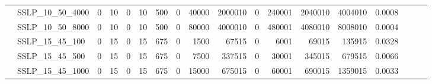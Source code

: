 \begin{landscape}
\begin{longtable}[c]{llrrrrrrrrrrrrrlll}
		& SSLP\_10\_50\_4000           & 0                           & 10                         & 0                          & 10                          & 500                        & 0                          & 40000                      & 2000010                   & 0                         & 240001                     & 2040010                    & 4004010                        & 0.0008                        &                          &                          &                          \\
		& SSLP\_10\_50\_8000           & 0                           & 10                         & 0                          & 10                          & 500                        & 0                          & 80000                      & 4000010                   & 0                         & 480001                     & 4080010                    & 8008010                        & 0.0004                        &                          &                          &                          \\
		& SSLP\_15\_45\_100            & 0                           & 15                         & 0                          & 15                          & 675                        & 0                          & 1500                       & 67515                     & 0                         & 6001                       & 69015                      & 135915                         & 0.0328                        &                          &                          &                          \\
		& SSLP\_15\_45\_500            & 0                           & 15                         & 0                          & 15                          & 675                        & 0                          & 7500                       & 337515                    & 0                         & 30001                      & 345015                     & 679515                         & 0.0066                        &                          &                          &                          \\
		& SSLP\_15\_45\_1000           & 0                           & 15                         & 0                          & 15                          & 675                        & 0                          & 15000                      & 675015                    & 0                         & 60001                      & 690015                     & 1359015                        & 0.0033                        &                          &                          &                          \\

\end{longtable}
\end{landscape}

